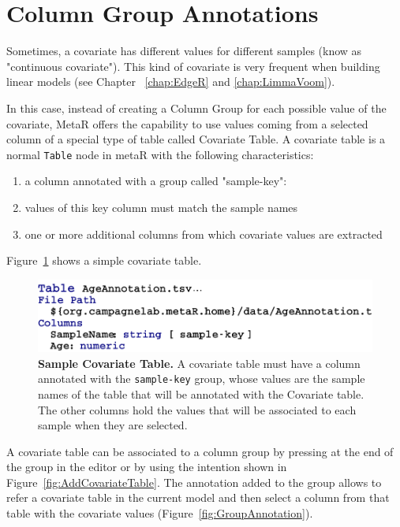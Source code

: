 \section{Column Group Annotations}\label{sec:ColumnGroupAnnotations}
Sometimes, a covariate has different values for different samples (know as "continuous covariate"). This kind of covariate is very frequent when building linear models (see Chapter ~\ref{chap:EdgeR} and \ref{chap:LimmaVoom}). 

In this case, instead of creating a Column Group for each possible value of the covariate, MetaR offers the capability to use values coming from a selected column of a special type of table called Covariate Table.  A covariate table is a normal \texttt{Table} node in metaR with the following characteristics:
\begin{enumerate}
\item a column annotated with a group called "sample-key": 
\item values of this key column must match the sample names 
\item one or more additional columns from which covariate values are extracted 
\end{enumerate}
Figure~\ref{fig:CovariateTable} shows a simple covariate table.

\begin{figure}[h!tbp]
  \centering
  \includegraphics[width=\figWidthWide]{figures/CovariateTable.pdf}
\caption[Covariate Table]{\textbf{Sample Covariate Table.} A covariate table must have a column annotated with the \texttt{sample-key} group, whose values are the sample names of the table that will be annotated with the Covariate table. The other columns hold the values that will be associated to each sample when they are selected.}
\label{fig:CovariateTable}
\end{figure}

A covariate table can be associated to a column group by pressing \keys{\lbrack} at the end of the group in the editor or by using the intention shown in Figure~\ref{fig:AddCovariateTable}.  The annotation added to the group allows to refer a covariate table in the current model and then select a column from that table with the covariate values (Figure~\ref{fig:GroupAnnotation}).

